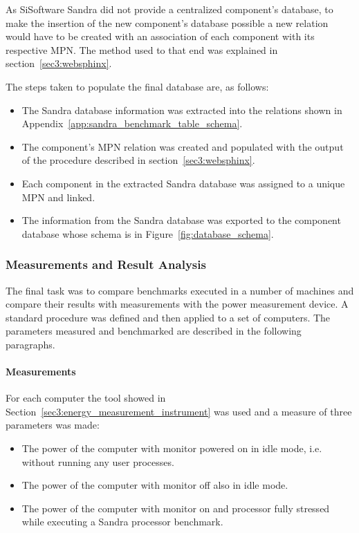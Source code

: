         As SiSoftware Sandra did not provide a centralized component's database, to make the insertion of the new component's database possible a new relation would have to be created with an association of each component with its respective MPN. The method used to that end was explained in section~\ref{sec3:websphinx}.
    
        The steps taken to populate the final database are, as follows:
        \begin{itemize}
            \item The Sandra database information was extracted into the relations shown in Appendix~\ref{app:sandra_benchmark_table_schema}.
            \item The component's MPN relation was created and populated with the output of the procedure described in section~\ref{sec3:websphinx}.
            \item Each component in the extracted Sandra database was assigned to a unique MPN and linked.
            \item The information from the Sandra database was exported to the component database whose schema is in Figure~\ref{fig:database_schema}.
        \end{itemize}
    
    \subsubsection*{Measurements and Result Analysis}
        The final task was to compare benchmarks executed in a number of machines and compare their results with measurements with the power measurement device. A standard procedure was defined and then applied to a set of computers. The parameters measured and benchmarked are described in the following paragraphs.

        \paragraph*{Measurements}
            For each computer the tool showed in Section~\ref{sec3:energy_measurement_instrument} was used and a measure of three parameters was made:
            \begin{itemize}
                \item The power of the computer with monitor powered on in idle mode, i.e. without running any user processes.
                \item The power of the computer with monitor off also in idle mode.
                \item The power of the computer with monitor on and processor fully stressed while executing a Sandra processor benchmark.
            \end{itemize}
            
